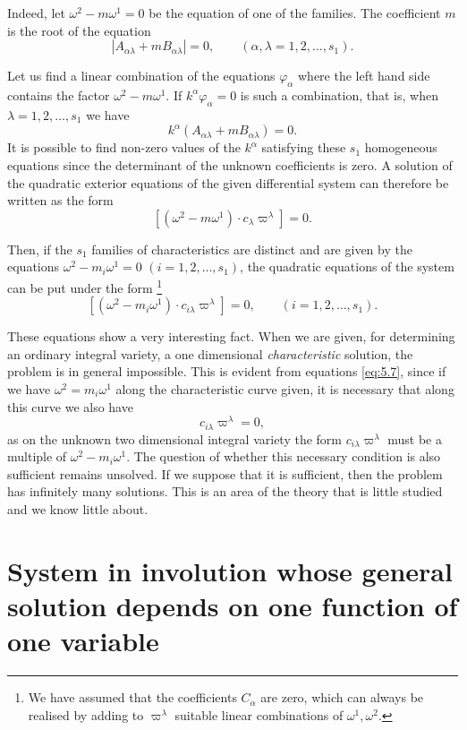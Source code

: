 \documentclass[leqno,11pt]{book}
\numberwithin{equation}{chapter}
\theoremstyle{shape1}
\theoremstyle{shape0}
\theoremstyle{shape2}
\theoremstyle{definition}
\begin{document}
Indeed, let $\omega^{2}-m\omega^{1}=0$ be the equation of one of the families. The coefficient $m$ is the root of the equation
\begin{equation}
  \label{eq:5.6}
  |A_{\alpha\lambda}+mB_{\alpha\lambda}|=0,\qquad(\alpha,\lambda=1,2,\dots,s_{1}).
\end{equation}

Let us find a linear combination of the equations $\varphi_{\alpha}$ where the left hand side contains the factor $\omega^{2}-m\omega^{1}$. If $k^{\alpha}\varphi_{\alpha}=0$ is such a combination, that is, when $\lambda=1,2,\dots,s_{1}$ we have
\[
k^{\alpha}(A_{\alpha\lambda}+mB_{\alpha\lambda})=0.
\]
It is possible to find non-zero values of the $k^{\alpha}$ satisfying these $s_{1}$ homogeneous equations since the determinant of the unknown coefficients is zero. A solution of the quadratic exterior equations of the given differential system can therefore be written as the form
\[
[(\omega^{2}-m\omega^{1})\cdot c_{\lambda}\varpi^{\lambda}]=0.
\]

Then, if the $s_{1}$ families of characteristics are distinct and are given by the equations $\omega^{2}-m_{i}\omega^{1}=0$ $(i=1,2,\dots,s_{1})$, the quadratic equations of the system can be put under the form \footnote{We have assumed that the coefficients $C_{\alpha}$ are zero, which can always be realised by adding to $\varpi^{\lambda}$ suitable linear combinations of $\omega^{1},\omega^{2}$.}
\begin{equation}
\label{eq:5.7}
[(\omega^{2}-m_{i}\omega^{1})\cdot c_{i\lambda}\varpi^{\lambda}]=0,\qquad(i=1,2,\dots,s_{1}).
\end{equation}

These equations show a very interesting fact. When we are given, for determining an ordinary integral variety, a one dimensional \emph{characteristic} solution, the problem is in general impossible. This is evident from equations \eqref{eq:5.7}, since if we have $\omega^{2}=m_{i}\omega^{1}$ along the characteristic curve given, it is necessary that along this curve we also have
\[
c_{i\lambda}\varpi^{\lambda}=0,
\]
as on the unknown two dimensional integral variety the form $c_{i \lambda}\varpi^{\lambda}$ must be a multiple of $\omega^{2}-m_{i}\omega^{1}$. The question of whether this necessary condition is also sufficient remains unsolved.  If we suppose that it is sufficient, then the problem has infinitely many solutions. This is an area of the theory that is little studied and we know little about.

\section{System in involution whose general solution depends on one function of one variable}
\label{sec:syst-invol-gener}
\end{document}
